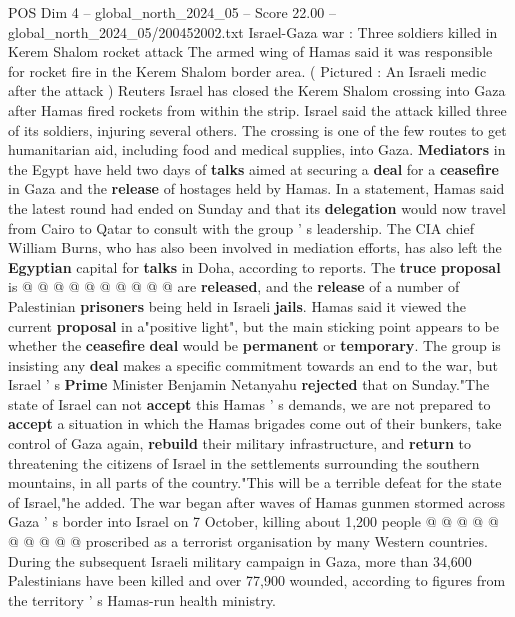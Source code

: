 \begin{textsample}{POS Dim 4 – global\_north\_2024\_05 – Score 22.00 – global\_north\_2024\_05/200452002.txt}  \label{ex:f4_pos_333}
Israel-Gaza war : Three soldiers killed in Kerem Shalom rocket attack The armed wing of Hamas said it was responsible for rocket fire in the Kerem Shalom border area. ( Pictured : An Israeli medic after the attack ) Reuters Israel has closed the Kerem Shalom crossing into Gaza after Hamas fired rockets from within the strip.
Israel said the attack killed three of its soldiers, injuring several others.
The crossing is one of the few routes to get humanitarian aid, including food and medical supplies, into Gaza. \textbf{Mediators} in the Egypt have held two days of \textbf{talks} aimed at securing a \textbf{deal} for a \textbf{ceasefire} in Gaza and the \textbf{release} of hostages held by Hamas.
In a statement, Hamas said the latest round had ended on Sunday and that its \textbf{delegation} would now travel from Cairo to Qatar to consult with the group ' s leadership.
The CIA chief William Burns, who has also been involved in mediation efforts, has also left the \textbf{Egyptian} capital for \textbf{talks} in Doha, according to reports.
The \textbf{truce} \textbf{proposal} is @ @ @ @ @ @ @ @ @ @ are \textbf{released}, and the \textbf{release} of a number of Palestinian \textbf{prisoners} being held in Israeli \textbf{jails}.
Hamas said it viewed the current \textbf{proposal} in a"positive light", but the main sticking point appears to be whether the \textbf{ceasefire} \textbf{deal} would be \textbf{permanent} or \textbf{temporary}.
The group is insisting any \textbf{deal} makes a specific commitment towards an end to the war, but Israel ' s \textbf{Prime} Minister Benjamin Netanyahu \textbf{rejected} that on Sunday."The state of Israel can not \textbf{accept} this Hamas ' s demands, we are not prepared to \textbf{accept} a situation in which the Hamas brigades come out of their bunkers, take control of Gaza again, \textbf{rebuild} their military infrastructure, and \textbf{return} to threatening the citizens of Israel in the settlements surrounding the southern mountains, in all parts of the country."This will be a terrible defeat for the state of Israel,"he added.
The war began after waves of Hamas gunmen stormed across Gaza ' s border into Israel on 7 October, killing about 1,200 people @ @ @ @ @ @ @ @ @ @ proscribed as a terrorist organisation by many Western countries.
During the subsequent Israeli military campaign in Gaza, more than 34,600 Palestinians have been killed and over 77,900 wounded, according to figures from the territory ' s Hamas-run health ministry.

\end{textsample}
